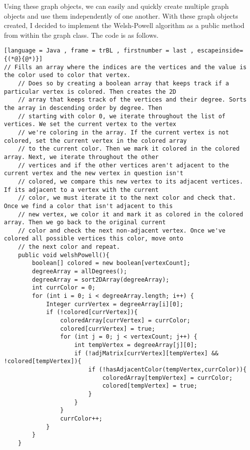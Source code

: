 \documentclass[12pt, letterpaper]{article}
\begin{document}
Using these graph objects, we can easily and quickly create multiple graph objects and use them independently of one another. With these graph objects created, I decided to implement the Welsh-Powell algorithm as a public method from within the graph class. The code is as follows.


\begin{lstlisting}[language = Java , frame = trBL , firstnumber = last , escapeinside={(*@}{@*)}]
// Fills an array where the indices are the vertices and the value is the color used to color that vertex.
    // Does so by creating a boolean array that keeps track if a particular vertex is colored. Then creates the 2D
    // array that keeps track of the vertices and their degree. Sorts the array in descending order by degree. Then
    // starting with color 0, we iterate throughout the list of vertices. We set the current vertex to the vertex
    // we're coloring in the array. If the current vertex is not colored, set the current vertex in the colored array
    // to the current color. Then we mark it colored in the colored array. Next, we iterate throughout the other
    // vertices and if the other vertices aren't adjacent to the current vertex and the new vertex in question isn't
    // colored, we compare this new vertex to its adjacent vertices. If its adjacent to a vertex with the current
    // color, we must iterate it to the next color and check that. Once we find a color that isn't adjacent to this
    // new vertex, we color it and mark it as colored in the colored array. Then we go back to the original current
    // color and check the next non-adjacent vertex. Once we've colored all possible vertices this color, move onto
    // the next color and repeat.
    public void welshPowell(){
        boolean[] colored = new boolean[vertexCount];
        degreeArray = allDegrees();
        degreeArray = sort2DArray(degreeArray);
        int currColor = 0;
        for (int i = 0; i < degreeArray.length; i++) {
            Integer currVertex = degreeArray[i][0];
            if (!colored[currVertex]){
                coloredArray[currVertex] = currColor;
                colored[currVertex] = true;
                for (int j = 0; j < vertexCount; j++) {
                    int tempVertex = degreeArray[j][0];
                    if (!adjMatrix[currVertex][tempVertex] && !colored[tempVertex]){
                        if (!hasAdjacentColor(tempVertex,currColor)){
                            coloredArray[tempVertex] = currColor;
                            colored[tempVertex] = true;
                        }
                    }
                }
                currColor++;
            }
        }
    }
\end{lstlisting}
\end{document}
